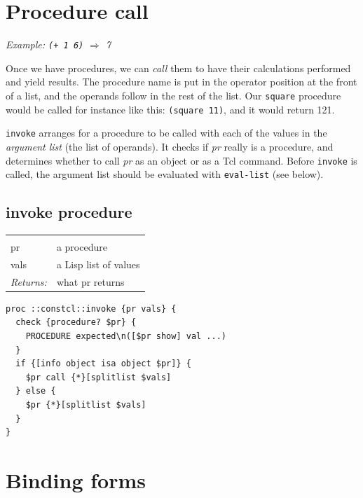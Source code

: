 \documentclass[twoside]{report}
\begin{document}
\section{Procedure call}
\label{procedure-call}

\emph{Example: \texttt{(+ 1 6)} $\Rightarrow$ 7}

Once we have procedures, we can \emph{call} them to have their calculations performed and yield results. The procedure name is put in the operator position at the front of a list, and the operands follow in the rest of the list. Our \texttt{square} procedure would be called for instance like this: \texttt{(square 11)}, and it would return 121.

\texttt{invoke} arranges for a procedure to be called with each of the values in the \emph{argument list} (the list of operands). It checks if \emph{pr} really is a procedure, and determines whether to call \emph{pr} as an object or as a Tcl command. Before \texttt{invoke} is called, the argument list should be evaluated with \texttt{eval-list} (see below).

\subsection{invoke procedure}
\label{invoke-procedure}

\noindent\begin{tabular}{ |p{1.9cm} p{8cm}| }
\hline
\rowcolor[HTML]{CCCCCC} \multicolumn{2}{|l|}{\bf invoke (internal)} \\
pr & a procedure \\
vals & a Lisp list of values \\
\textit{Returns:} & what pr returns \\
\hline
\end{tabular}

\begin{lstlisting}
proc ::constcl::invoke {pr vals} {
  check {procedure? $pr} {
    PROCEDURE expected\n([$pr show] val ...)
  }
  if {[info object isa object $pr]} {
    $pr call {*}[splitlist $vals]
  } else {
    $pr {*}[splitlist $vals]
  }
}
\end{lstlisting}

\section{Binding forms}
\label{binding-forms}
\end{document}
